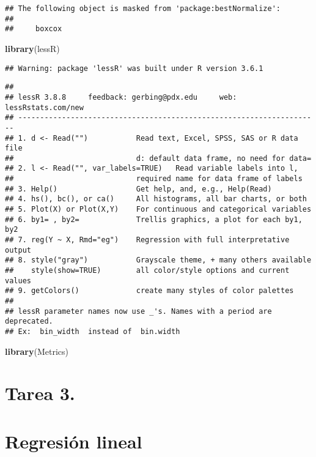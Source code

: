 \documentclass[]{article}
\newenvironment{Shaded}{\begin{snugshade}}{\end{snugshade}}
\newcommand{\KeywordTok}[1]{\textcolor[rgb]{0.13,0.29,0.53}{\textbf{#1}}}
\newcommand{\NormalTok}[1]{#1}
\begin{document}
\begin{verbatim}
## The following object is masked from 'package:bestNormalize':
## 
##     boxcox
\end{verbatim}

\begin{Shaded}
\begin{Highlighting}[]
\KeywordTok{library}\NormalTok{(lessR)}
\end{Highlighting}
\end{Shaded}

\begin{verbatim}
## Warning: package 'lessR' was built under R version 3.6.1
\end{verbatim}

\begin{verbatim}
## 
## lessR 3.8.8     feedback: gerbing@pdx.edu     web: lessRstats.com/new
## ---------------------------------------------------------------------
## 1. d <- Read("")           Read text, Excel, SPSS, SAS or R data file
##                            d: default data frame, no need for data=
## 2. l <- Read("", var_labels=TRUE)   Read variable labels into l,
##                            required name for data frame of labels
## 3. Help()                  Get help, and, e.g., Help(Read)
## 4. hs(), bc(), or ca()     All histograms, all bar charts, or both
## 5. Plot(X) or Plot(X,Y)    For continuous and categorical variables
## 6. by1= , by2=             Trellis graphics, a plot for each by1, by2
## 7. reg(Y ~ X, Rmd="eg")    Regression with full interpretative output
## 8. style("gray")           Grayscale theme, + many others available
##    style(show=TRUE)        all color/style options and current values
## 9. getColors()             create many styles of color palettes
## 
## lessR parameter names now use _'s. Names with a period are deprecated.
## Ex:  bin_width  instead of  bin.width
\end{verbatim}

\begin{Shaded}
\begin{Highlighting}[]
\KeywordTok{library}\NormalTok{(Metrics)}
\end{Highlighting}
\end{Shaded}

\hypertarget{tarea-3.}{%
\section{Tarea 3.}\label{tarea-3.}}

\hypertarget{regresion-lineal}{%
\section{Regresión lineal}\label{regresion-lineal}}
\end{document}
